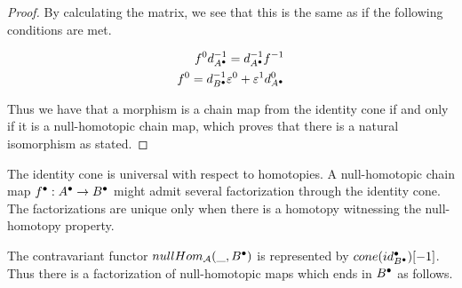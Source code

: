 \begin{proof}
        By calculating the matrix, we see that this is the same as if the following conditions are met.

        \begin{align*}
            f^0d^{-1}_{A^{\bullet}} = d^{-1}_{A^{\bullet}}f^{-1} \\
            f^0 = d^{-1}_{B^{\bullet}}\varepsilon^0 + \varepsilon^1d^0_{A^{\bullet}}
        \end{align*}

        Thus we have that a morphism is a chain map from the identity cone if and only if it is a null-homotopic chain map, which proves that there is a natural isomorphism as stated.
    \end{proof}

    \begin{remark}
        The identity cone is universal with respect to homotopies. A null-homotopic chain map $f^{\bullet}:A^{\bullet}\rightarrow B^{\bullet}$ might admit several factorization through the identity cone. The factorizations are unique only when there is a homotopy witnessing the null-homotopy property.
        \begin{center}
        \end{center}
    \end{remark}

    \begin{corollary}
        The contravariant functor $nullHom_{\mathcal{A}}(\_,B^{\bullet})$ is represented by $cone(id_{B^{\bullet}}^{\bullet})[-1]$. Thus there is a factorization of null-homotopic maps which ends in $B^{\bullet}$ as follows.

        \begin{center}
        \end{center}
    \end{corollary}

